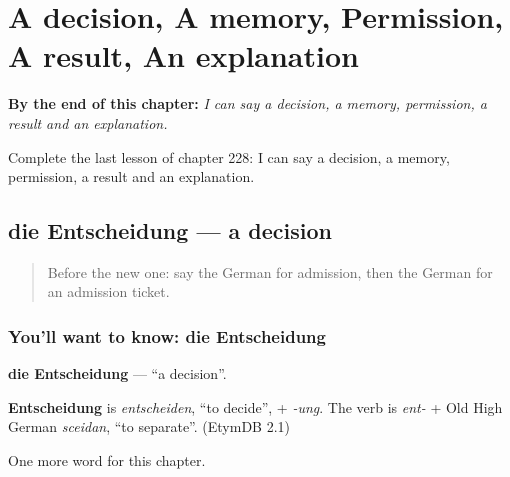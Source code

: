 
\chapter{A decision, A memory, Permission, A result, An explanation}
\label{ch:ge-a-decision-a-memory-permission-a-result-an-explanation}

\begin{chapteropening}
\textbf{By the end of this chapter:} \emph{I can say a decision, a memory, permission, a result and an explanation.}

Complete the last lesson of chapter 228: I can say a decision, a memory, permission, a result and an explanation.
\end{chapteropening}

\section[die Entscheidung]{die Entscheidung — a decision}

\label{lesson:GE-C228-entscheidung}



\begin{quote}
Before the new one: say the German for admission, then the German for an admission ticket.
\end{quote}

\subsection*{You'll want to know: die Entscheidung}
\textbf{die Entscheidung} — \textquotedblleft{}a decision\textquotedblright{}.

\begin{cousinweb}
\textbf{Entscheidung} is \emph{entscheiden}, \textquotedblleft{}to decide\textquotedblright{}, + \emph{-ung}. The verb is \emph{ent-} + Old High German \emph{sceidan}, \textquotedblleft{}to separate\textquotedblright{}. (EtymDB 2.1)
\end{cousinweb}

\begin{grammarlens}[title={What you've built}]
One more word for this chapter.
\end{grammarlens}


